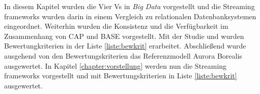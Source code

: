 In diesem Kapitel wurden die Vier Vs in \textit{Big Data} vorgestellt und die Streaming frameworks wurden darin in einem Vergleich zu relationalen Datenbanksystemen eingeordnet. Weiterhin wurden die Konsistenz und die Verfügbarkeit im Zusammenhang von CAP und BASE vorgestellt. Mit der Studie  und  wurden Bewertungkriterien in der Liste \ref{liste:bewkrit} erarbeitet. Abschließend wurde ausgehend von den Bewertungskriterien das Referenzmodell Aurora Borealis ausgewertet. In Kapitel \ref{chapter:vorstellung} werden nun die Streaming frameworks vorgestellt und mit Bewertungskriterien in Liste \ref{liste:bewkrit} ausgewertet.